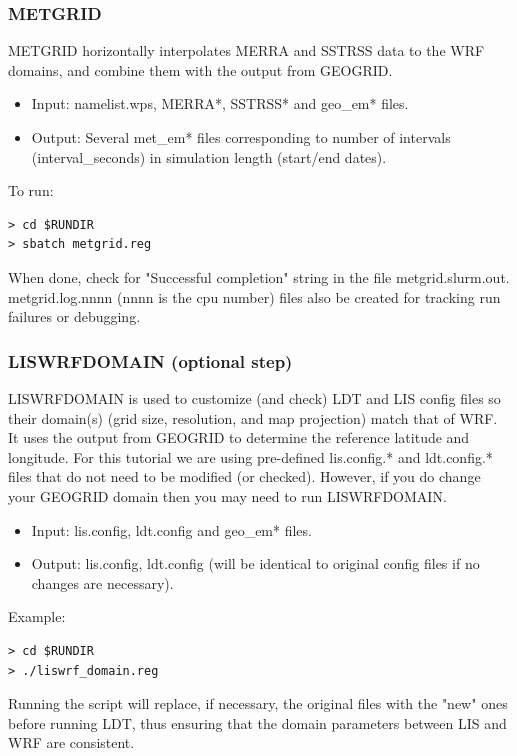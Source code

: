 \begin{frame}[fragile]\frametitle{METGRID}

\footnotesize{
METGRID horizontally interpolates MERRA and SSTRSS data to the WRF domains, and combine them with the
output from GEOGRID.
\begin{itemize}
\item Input: namelist.wps, MERRA*, SSTRSS* and geo\_em* files.
\item Output: Several met\_em* files corresponding to number of intervals (interval\_seconds) in simulation length (start/end dates).
\end{itemize}
}    
\hrulefill\par
\footnotesize{To run:}
\begin{lstlisting}
> cd $RUNDIR
> sbatch metgrid.reg
\end{lstlisting}
When done, check for  "Successful completion" string in the file metgrid.slurm.out. metgrid.log.nnnn (nnnn is the cpu number) files also be created for tracking run failures or debugging.


\end{frame}

\begin{frame}[fragile]\frametitle{LISWRFDOMAIN (optional step)}

\footnotesize{
LISWRFDOMAIN is used to customize (and check) LDT and LIS config files so their domain(s) (grid size, resolution, and map projection) match that of WRF. It uses the output from GEOGRID  to determine the reference latitude and longitude. For this tutorial we are using pre-defined lis.config.* and ldt.config.* files that do not need to be modified (or checked). However, if you do change your GEOGRID domain  then you may need to run LISWRFDOMAIN.
\begin{itemize}
\item Input: lis.config, ldt.config and geo\_em* files.
\item Output: lis.config, ldt.config (will be identical to original config files if no changes are necessary).
\end{itemize}
}    
\hrulefill\par
\footnotesize{Example:}
\begin{lstlisting}
> cd $RUNDIR
> ./liswrf_domain.reg
\end{lstlisting}
\scriptsize{
Running the script will replace, if necessary, the original files with the "new" ones before running LDT, thus ensuring that the domain parameters between LIS and WRF are consistent.
}
\end{frame}

